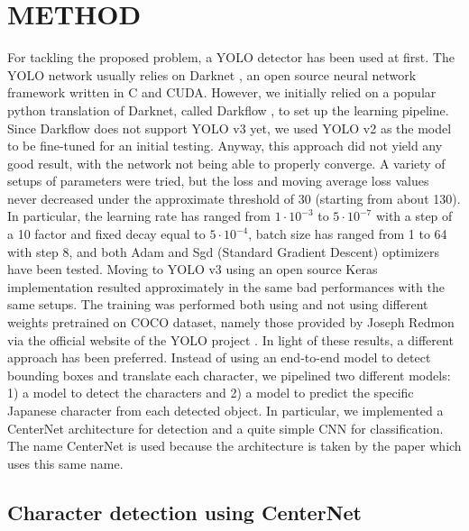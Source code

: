 \section{METHOD}
\label{sec:method}

For tackling the proposed problem, a YOLO detector has been used at first. The YOLO network usually relies on Darknet \cite{darknet2018}, an open source neural network framework written in C and CUDA. However, we initially relied on a popular python translation of Darknet, called Darkflow \cite{thtrieu2016}, to set up the learning pipeline. Since Darkflow does not support YOLO v3 yet, we used YOLO v2 as the model to be fine-tuned for an initial testing. Anyway, this approach did not yield any good result, with the network not being able to properly converge. A variety of setups of parameters were tried, but the loss and moving average loss values never decreased under the approximate threshold of 30 (starting from about 130). In particular, the learning rate has ranged from $1 \cdot 10^{-3}$ to $5 \cdot 10^{-7}$ with a step of a 10 factor and fixed decay equal to $5 \cdot 10^{-4}$, batch size has ranged from 1 to 64 with step 8, and both Adam and Sgd (Standard Gradient Descent) optimizers have been tested. Moving to YOLO v3 using an open source Keras implementation \cite{experiencor2018} resulted approximately in the same bad performances with the same setups. The training was performed both using and not using different weights pretrained on COCO dataset, namely those provided by Joseph Redmon via the official website of the YOLO project \cite{yolo2018}. In light of these results, a different approach has been preferred. Instead of using an end-to-end model to detect bounding boxes and translate each character, we pipelined two different models: 1) a model to detect the characters and 2) a model to predict the specific Japanese character from each detected object. In particular, we implemented a CenterNet architecture for detection and a quite simple CNN for classification. The name CenterNet is used because the architecture is taken by the paper  \cite{Zhou2019-sd} which uses this same name.

\subsection{Character detection using CenterNet}
\label{ssec:charactercenternet}

